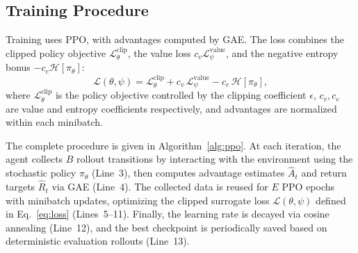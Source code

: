 \subsection{Training Procedure}
\label{sec:method:train}

Training uses PPO, with advantages computed by GAE. The loss combines the clipped policy objective $\mathcal{L}^{\text{clip}}_\theta$, the value loss $c_v\mathcal{L}^{\text{value}}_\psi$, and the negative entropy bonus $-c_e\mathcal{H}[\pi_\theta]$:
\begin{equation}
\mathcal{L}(\theta,\psi) = \mathcal{L}^{\text{clip}}_\theta + c_v\,\mathcal{L}^{\text{value}}_\psi - c_e\,\mathcal{H}[\pi_\theta],
\label{eq:loss}
\end{equation}
where $\mathcal{L}^{\text{clip}}_\theta$ is the policy objective controlled by the clipping coefficient $\epsilon$, $c_v, c_e$ are value and entropy coefficients respectively, and advantages are normalized within each minibatch. 


The complete procedure is given in Algorithm~\ref{alg:ppo}. At each iteration, the agent collects $B$ rollout transitions by interacting with the environment using the stochastic policy $\pi_\theta$ (Line~3), then computes advantage estimates $\hat A_t$ and return targets $\hat R_t$ via GAE (Line~4).
The collected data is reused for $E$ PPO epochs with minibatch updates, optimizing the clipped surrogate loss $\mathcal{L}(\theta,\psi)$ defined in Eq.~\eqref{eq:loss} (Lines~5--11). Finally, the learning rate is decayed via cosine annealing (Line~12), and the best checkpoint is periodically saved based on deterministic evaluation rollouts (Line~13).



